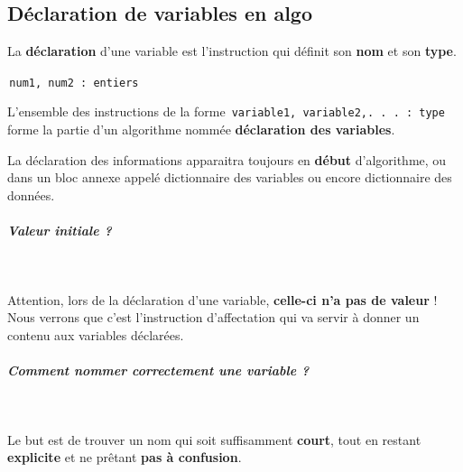 \documentclass[11pt,a4paper]{article}
\begin{document}
        \subsection{D\'eclaration de variables en algo}
          La \textbf{d\'eclaration} d'une variable est l'instruction qui d\'efinit son \textbf{nom} 
          et son \textbf{type}.
        
            \par
        \,\verb|num1, num2 : entiers|\,
            \par
        
          L'ensemble des instructions de la forme \,\verb|variable1, variable2,. . . : type|\,
          forme la partie d'un algorithme nomm\'ee \textbf{d\'eclaration des variables}. 
        
            \par
        
          La d\'eclaration des informations apparaitra toujours en \textbf{d\'ebut} d'algorithme, ou dans un bloc annexe appel\'e
          dictionnaire des variables ou encore dictionnaire des donn\'ees.
        
            \par
        
			
		\subparagraph{Valeur initiale ?} 
		
					\textcolor{white}{.} \par
				
            \par
        
          Attention, lors de la d\'eclaration d'une variable, \textbf{celle-ci n'a pas de valeur} ! 
          Nous verrons que c'est l'instruction d'affectation qui va servir \`a donner un contenu aux variables d\'eclar\'ees.
        
            \par
        
			
		\subparagraph{Comment nommer correctement une variable ?} 
		
					\textcolor{white}{.} \par
				
            \par
        
          Le but est de trouver un nom qui soit suffisamment \textbf{court}, 
          tout en restant \textbf{explicite} et ne pr\^etant \textbf{pas \`a confusion}.
        
            \par
        
\end{document}
